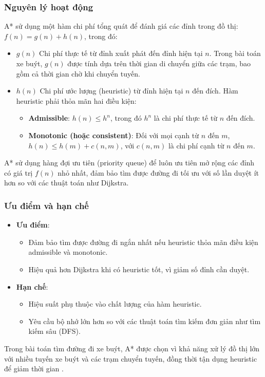 \documentclass[a4paper,12pt]{article}
\begin{document}
\subsubsection{Nguyên lý hoạt động}

A* \cite{cormen2009} sử dụng một hàm chi phí tổng quát để đánh giá các đỉnh trong đồ thị: $f(n) = g(n) + h(n)$, trong đó:
\begin{itemize}
    \item $g(n)$ Chi phí thực tế từ đỉnh xuất phát đến đỉnh hiện tại $n$. Trong bài toán xe buýt, $g(n)$ được tính dựa trên thời gian di chuyển giữa các trạm, bao gồm cả thời gian chờ khi chuyển tuyến.
    \item $h(n)$ Chi phí ước lượng (heuristic) từ đỉnh hiện tại $n$ đến đích. Hàm heuristic phải thỏa mãn hai điều kiện:
    \begin{itemize}
        \item \textbf{Admissible}: $h(n) \leq h^n$, trong đó $h^n$ là chi phí thực tế từ $n$ đến đích.
        \item \textbf{Monotonic (hoặc consistent)}: Đối với mọi cạnh từ $n$ đến $m$, $h(n) \leq h(m) + c(n, m)$, với $c(n, m)$ là chi phí cạnh từ $n$ đến $m$.
    \end{itemize}
\end{itemize}

A* \cite{cormen2009} sử dụng hàng đợi ưu tiên (priority queue) để luôn ưu tiên mở rộng các đỉnh có giá trị $f(n)$ nhỏ nhất, đảm bảo tìm được đường đi tối ưu với số lần duyệt ít hơn so với các thuật toán như Dijkstra.

\subsubsection{Ưu điểm và hạn chế}

\begin{itemize}
    \item \textbf{Ưu điểm}:
    \begin{itemize}
        \item Đảm bảo tìm được đường đi ngắn nhất nếu heuristic thỏa mãn điều kiện admissible và monotonic.
        \item Hiệu quả hơn Dijkstra khi có heuristic tốt, vì giảm số đỉnh cần duyệt.
    \end{itemize}
    \item \textbf{Hạn chế}:
    \begin{itemize}
        \item Hiệu suất phụ thuộc vào chất lượng của hàm heuristic.
        \item Yêu cầu bộ nhớ lớn hơn so với các thuật toán tìm kiếm đơn giản như tìm kiếm sâu (DFS).
    \end{itemize}
\end{itemize}
Trong bài toán tìm đường đi xe buýt, A* được chọn vì khả năng xử lý đồ thị lớn với nhiều tuyến xe buýt và các trạm chuyển tuyến, đồng thời tận dụng heuristic để giảm thời gian \cite{delling2009}.
\end{document}
